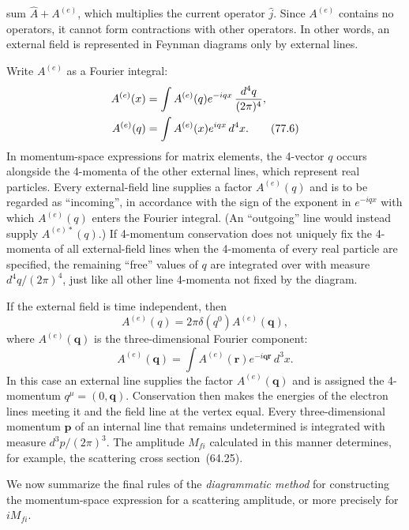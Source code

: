 sum $\hat A+A^{(e)}$, which multiplies the current operator $\hat j$. Since $A^{(e)}$ contains no operators, it cannot form contractions with other operators. In other words, an external field is represented in Feynman diagrams only by external lines.

Write $A^{(e)}$ as a Fourier integral:
\begin{align}
A^{(e)}(x)&=\int A^{(e)}(q)e^{-iqx}\,\frac{d^4q}{(2\pi)^4},\notag\\
A^{(e)}(q)&=\int A^{(e)}(x)e^{iqx}\,d^4x.
\tag{77.6}
\end{align}
In momentum-space expressions for matrix elements, the 4-vector $q$ occurs alongside the 4-momenta of the other external lines, which represent real particles. Every external-field line supplies a factor $A^{(e)}(q)$ and is to be regarded as ``incoming'', in accordance with the sign of the exponent in $e^{-iqx}$ with which $A^{(e)}(q)$ enters the Fourier integral. (An ``outgoing'' line would instead supply $A^{(e)*}(q)$.) If 4-momentum conservation does not uniquely fix the 4-momenta of all external-field lines when the 4-momenta of every real particle are specified, the remaining ``free'' values of $q$ are integrated over with measure $d^4q/(2\pi)^4$, just like all other line 4-momenta not fixed by the diagram.

If the external field is time independent, then
\begin{equation}
A^{(e)}(q)=2\pi\delta(q^0)A^{(e)}(\mathbf q),
\tag{77.7}
\end{equation}
where $A^{(e)}(\mathbf q)$ is the three-dimensional Fourier component:
\begin{equation}
A^{(e)}(\mathbf q)=\int A^{(e)}(\mathbf r)e^{-i\mathbf q\mathbf r}\,d^3x.
\tag{77.8}
\end{equation}
In this case an external line supplies the factor $A^{(e)}(\mathbf q)$ and is assigned the 4-momentum $q^\mu=(0,\mathbf q)$. Conservation then makes the energies of the electron lines meeting it and the field line at the vertex equal. Every three-dimensional momentum $\mathbf p$ of an internal line that remains undetermined is integrated with measure $d^3p/(2\pi)^3$. The amplitude $M_{fi}$ calculated in this manner determines, for example, the scattering cross section~(64.25).

We now summarize the final rules of the \emph{diagrammatic method} for constructing the momentum-space expression for a scattering amplitude, or more precisely for $iM_{fi}$.

